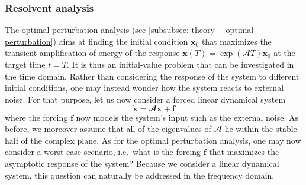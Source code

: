     \subsubsection{Resolvent analysis}
    \label{subsubsec: theory -- resolvent perturbation}

    The optimal perturbation analysis (see \textsection \ref{subsubsec: theory -- optimal perturbation}) aims at finding the initial condition $\mathbf{x}_0$ that maximizes the transient amplification of energy of the response $\mathbf{x}(T) = \exp \left( \mathbfcal{A} T \right) \mathbf{x}_0$ at the target time $t=T$. It is thus an initial-value problem that can be investigated in the time domain. Rather than considering the response of the system to different initial conditions, one may instead wonder how the system reacts to external noise. For that purpose, let us now consider a forced linear dynamical system
    \begin{equation}
      \dot{\mathbf{x}} = \mathbfcal{A} \mathbf{x} + \mathbf{f}
      \label{eq: theory -- forced linear system}
    \end{equation}
    where the forcing $\mathbf{f}$ now models the system's input such as the external noise. As before, we moreover assume that all of the eigenvalues of $\mathbfcal{A}$ lie within the stable half of the complex plane. As for the optimal perturbation analysis, one may now consider a worst-case scenario, i.e.\ what is the forcing $\mathbf{f}$ that maximizes the asymptotic response of the system? Because we consider a linear dynamical system, this question can naturally be addressed in the frequency domain.

